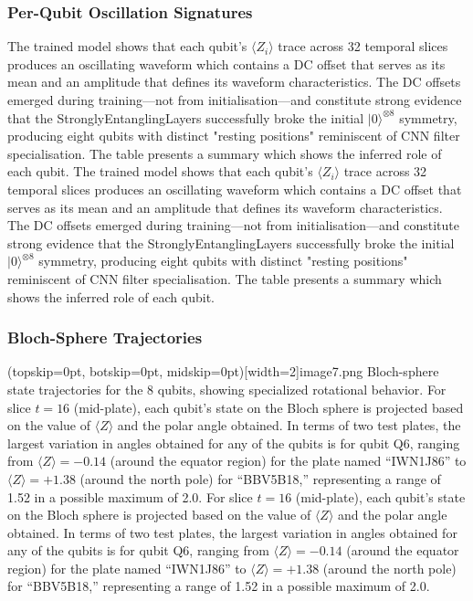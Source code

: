 \documentclass{ieeeaccess}
\begin{document}
\subsubsection{Per-Qubit Oscillation Signatures}
The trained model shows that each qubit's $\langle Z_i \rangle$ trace across 32 temporal slices produces an oscillating waveform which contains a DC offset that serves as its mean and an amplitude that defines its waveform characteristics. The DC offsets emerged during training---not from initialisation---and constitute strong evidence that the StronglyEntanglingLayers successfully broke the initial $|0\rangle^{\otimes 8}$ symmetry, producing eight qubits with distinct "resting positions" reminiscent of CNN filter specialisation. The table presents a summary which shows the inferred role of each qubit.
The trained model shows that each qubit's $\langle Z_i \rangle$ trace across 32 temporal slices produces an oscillating waveform which contains a DC offset that serves as its mean and an amplitude that defines its waveform characteristics. The DC offsets emerged during training---not from initialisation---and constitute strong evidence that the StronglyEntanglingLayers successfully broke the initial $|0\rangle^{\otimes 8}$ symmetry, producing eight qubits with distinct "resting positions" reminiscent of CNN filter specialisation. The table presents a summary which shows the inferred role of each qubit.

\subsubsection{Bloch-Sphere Trajectories}
\Figure[htbp](topskip=0pt, botskip=0pt, midskip=0pt)[width=2\columnwidth]{image7.png}
{Bloch-sphere state trajectories for the 8 qubits, showing specialized rotational behavior.\label{fig:bloch}}
For slice $t = 16$ (mid-plate), each qubit’s state on the Bloch sphere is projected based on the value of $\langle Z \rangle$ and the polar angle obtained. In terms of two test plates, the largest variation in angles obtained for any of the qubits is for qubit Q6, ranging from $\langle Z \rangle = -0.14$ (around the equator region) for the plate named ``IWN1J86'' to $\langle Z \rangle = +1.38$ (around the north pole) for ``BBV5B18,'' representing a range of 1.52 in a possible maximum of 2.0.
For slice $t = 16$ (mid-plate), each qubit’s state on the Bloch sphere is projected based on the value of $\langle Z \rangle$ and the polar angle obtained. In terms of two test plates, the largest variation in angles obtained for any of the qubits is for qubit Q6, ranging from $\langle Z \rangle = -0.14$ (around the equator region) for the plate named ``IWN1J86'' to $\langle Z \rangle = +1.38$ (around the north pole) for ``BBV5B18,'' representing a range of 1.52 in a possible maximum of 2.0.
\end{document}
